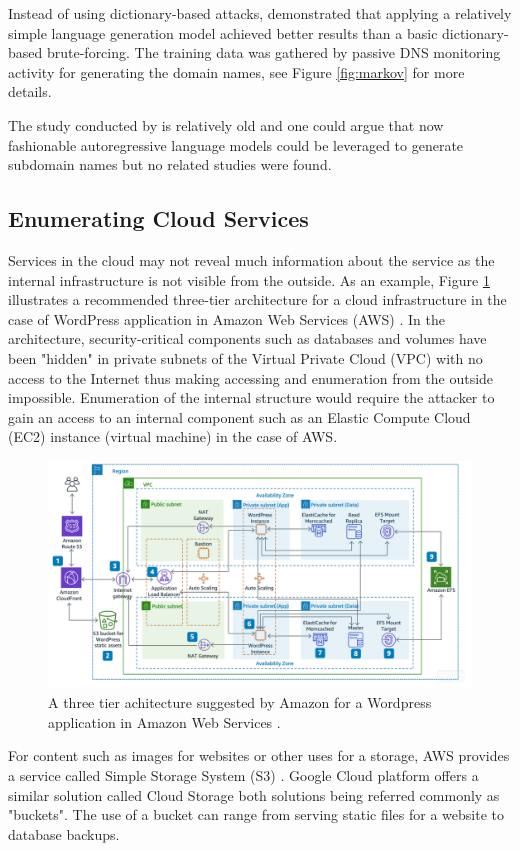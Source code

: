 Instead of using dictionary-based attacks, \citet{SMART_BRUTE} demonstrated that applying a relatively simple language generation model achieved better results than a basic dictionary-based brute-forcing. The training data was gathered by passive DNS monitoring activity for generating the domain names, see Figure \ref{fig:markov} for more details.


The study conducted by \citet{SMART_BRUTE} is relatively old and one could argue that now fashionable autoregressive language models could be leveraged to generate subdomain names but no related studies were found.


\subsection{Enumerating Cloud Services}
\label{sec:cloud}


Services in the cloud may not reveal much information about the service as the internal infrastructure is not visible from the outside. As an example, Figure \ref{fig:cloud_structure} illustrates a recommended three-tier architecture for a cloud infrastructure in the case of WordPress application in Amazon Web Services (\textsf{AWS}) \cite{AWSbestpractices}. In the architecture, security-critical components such as databases and volumes have been "hidden" in private subnets of the Virtual Private Cloud (VPC) with no access to the Internet thus making accessing and enumeration from the outside impossible. Enumeration of the internal structure would require the attacker to gain an access to an internal component such as an Elastic Compute Cloud (\textsf{EC2}) instance (virtual machine) in the case of AWS.

\begin{figure}[htb]
  \begin{center}
    \includegraphics[width=1.0\textwidth]{cloud_rakenne.png}
    \caption{A three tier achitecture suggested by Amazon for a Wordpress application in Amazon Web Services \cite{AWSbestpractices}.} 
    \label{fig:cloud_structure}
  \end{center}
\end{figure}
For content such as images for websites or other uses for a storage, AWS provides a service called Simple Storage System (\textsf{S3}) \cite{s3buckets}. Google Cloud platform offers a similar solution called Cloud Storage \cite{googlebuckets} both solutions being referred commonly as "buckets". The use of a bucket can range from serving static files for a website to database backups.

